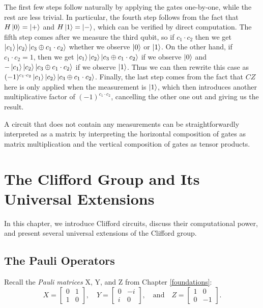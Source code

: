 \documentclass[12pt]{dalthesis}
\begin{document}
The first few steps follow naturally by applying the gates one-by-one, while the rest are less trivial. In particular, the fourth step follows from the fact that $H\ket{0} = \ket{+}$ and $H\ket{1} = \ket{-}$, which can be verified by direct computation. The fifth step comes after we measure the third qubit, so if $c_1 \cdot c_2$ then we get $\ket{c_1}\ket{c_2}\ket{c_3 \oplus c_1 \cdot c_2}$ whether we observe $\ket{0}$ or $\ket{1}$. On the other hand, if $c_1 \cdot c_2 = 1$, then we get $\ket{c_1}\ket{c_2}\ket{c_3 \oplus c_1 \cdot c_2}$ if we observe $\ket{0}$ and $-\ket{c_1}\ket{c_2}\ket{c_3 \oplus c_1 \cdot c_2}$ if we observe $\ket{1}$. Thus we can then rewrite this case as $(-1)^{c_1 \cdot c_2} \ket{c_1}\ket{c_2}\ket{c_3 \oplus c_1 \cdot c_2}$. Finally, the last step comes from the fact that $CZ$ here is only applied when the measurement is $\ket{1}$, which then introduces another multiplicative factor of $(-1)^{c_1 \cdot c_2}$, cancelling the other one out and giving us the result.

A circuit that does not contain any measurements can be straightforwardly interpreted as a matrix by interpreting the horizontal composition of gates as matrix multiplication and the vertical composition of gates as tensor products. 
 

\chapter{The Clifford Group and Its Universal Extensions}
\label{chap Stab}

In this chapter, we introduce Clifford circuits, discuss their computational power, and present several universal extensions of the Clifford group.

\section{The Pauli Operators}

Recall the \emph{Pauli matrices} X, Y, and Z from Chapter \ref{foundations}:
  \[
  X= \begin{bmatrix}
    0 & 1 \\
    1 & 0
  \end{bmatrix}, \quad
  Y = \begin{bmatrix}
  0 & -i \\
  i & 0
  \end{bmatrix}, \quad \mbox{and} \quad
  Z = \begin{bmatrix}
  1 & 0 \\
  0 & -1
  \end{bmatrix}.
  \]
\end{document}
